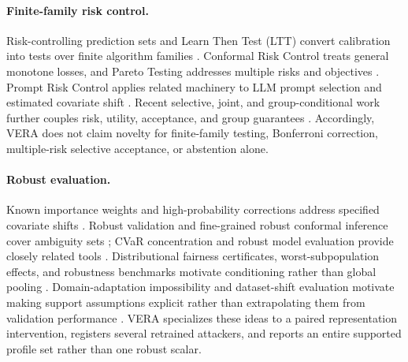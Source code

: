 \paragraph{Finite-family risk control.}
Risk-controlling prediction sets and Learn Then Test (LTT) convert calibration
into tests over finite algorithm families
\cite{bates2021rcps,angelopoulos2025ltt}. Conformal Risk Control treats general
monotone losses, and Pareto Testing addresses multiple risks and objectives
\cite{angelopoulos2024crc,laufer2023pareto}. Prompt Risk Control applies related
machinery to LLM prompt selection and estimated covariate shift
\cite{zollo2024prompt}. Recent selective, joint, and group-conditional work
further couples risk, utility, acceptance, and group guarantees
\cite{xu2025scrc,yu2026joint,huang2026conditional}. Accordingly, VERA does not claim
novelty for finite-family testing, Bonferroni correction, multiple-risk
selective acceptance, or abstention alone.

\paragraph{Robust evaluation.}
Known importance weights and high-probability corrections address specified
covariate shifts \cite{tibshirani2019covariate,almeida2025hprc,zecchin2025wcrc}. Robust
validation and fine-grained robust conformal inference cover ambiguity sets
\cite{cauchois2024robust,ai2024finegrained}; CVaR concentration and robust model
evaluation provide closely related tools
\cite{thomas2019cvar,najafi2025federated,waudbysmith2024means}. Distributional
fairness certificates, worst-subpopulation effects, and robustness benchmarks
motivate conditioning rather than global pooling
\cite{kang2022certifying,ehyaei2025fragile,jeong2020worstcase,sagawa2020groupdro,koh2021wilds}.
Domain-adaptation impossibility and dataset-shift evaluation motivate making
support assumptions explicit rather than extrapolating them from validation
performance \cite{bendavid2010impossibility,subbaswamy2021evaluation}.
VERA specializes these ideas to a paired representation intervention, registers
several retrained attackers, and reports an entire supported profile set rather
than one robust scalar.

